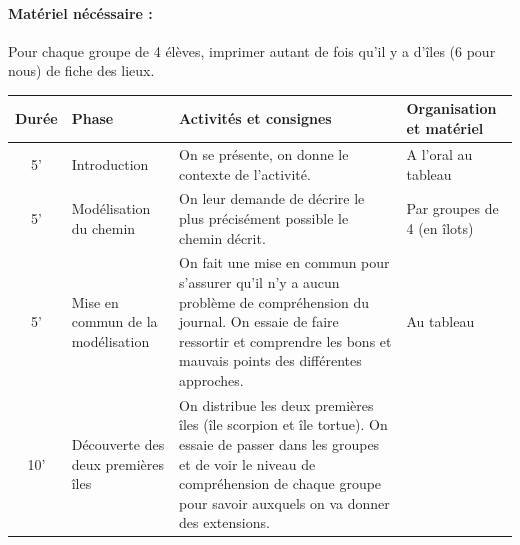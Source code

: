 \documentclass[12pt, a4paper]{article}
\begin{document}
  \paragraph*{Matériel nécéssaire :}
    Pour chaque groupe de 4 élèves, imprimer autant de fois qu'il y a d'îles (6 pour nous) de fiche des lieux.
	\begin{longtable}{c|m{3.9cm}|m{8.4cm}|m{2.4cm}}		\textbf{Durée} & \textbf{Phase} & \textbf{Activités et consignes} & \textbf{Organisation et matériel} \\ \hline\hline
		
		5' &
		
		Introduction
		
		&
		
		On se présente, on donne le contexte de l'activité.
		
		&
		
		A l'oral au tableau
		
		\\ \hline
		
	  5' &
		
    Modélisation du chemin
		
		&
	
    On leur demande de décrire le plus précisément possible le chemin décrit.
		
		& Par groupes de 4 (en îlots)
		
		\\ \hline
		
		5' &
		
		Mise en commun de la modélisation
		
		&
		
    On fait une mise en commun pour s'assurer qu'il n'y a aucun problème de compréhension du journal.
    On essaie de faire ressortir et comprendre les bons et mauvais points des différentes approches.

		&
		
		Au tableau
		
		\\ \hline
		
		10'
		
		&
		
	  Découverte des deux premières îles
		
		&
		
		On distribue les deux premières îles (île scorpion et île tortue). On essaie de passer dans les groupes et de voir le niveau de
    compréhension de chaque groupe pour savoir auxquels on va donner des extensions.
		

\end{longtable}
\end{document}
